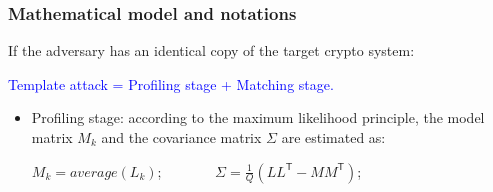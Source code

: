 \documentclass{beamer}
\begin{document}
\begin{frame}

\frametitle{Mathematical model and notations}



If the adversary has an identical copy of the target crypto system:%
\pause




\textcolor{blue}{Template attack = Profiling stage + Matching stage.}
\pause

\begin{itemize}
\item Profiling stage: according to the maximum likelihood principle, the model matrix $M_k$ and the covariance matrix $\Sigma$ are estimated as:

\medskip

$M_k= average(L_k)$;
\ \ \ \ \ \ \ $\Sigma=   \frac1Q (L L^\mathsf{T} - M M^\mathsf{T})$;
\end{itemize}



\end{frame}
\end{document}
